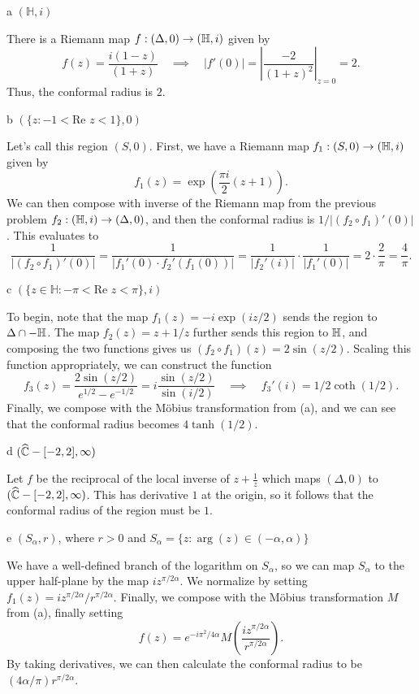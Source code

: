 \documentclass{pset}
\begin{document}
\begin{parts}
  \begin{part}{a}
    $(\mathbb{H}, i)$
  \end{part}

  There is a Riemann map $f : (\Delta, 0) \to (\mathbb{H}, i)$ given by 
  \[
    f(z) = \frac{i(1-z)}{(1+z)}\quad\implies\quad |f'(0)| = \left|\frac{-2}{(1+z)^2}\right|_{z=0} = 2.
  \]
  Thus, the conformal radius is $2$.

  \begin{part}{b}
    $(\{z : -1<\textrm{Re }z<1\}, 0)$
  \end{part}

  Let's call this region $(S, 0)$. First, we have a Riemann map $f_1 : (S, 0) \to (\mathbb{H}, i)$ given by
  \[
    f_1(z) = \exp\left( \frac{\pi i}{2}(z+1)\right).
  \]
  We can then compose with inverse of the Riemann map from the previous problem $f_2 : (\mathbb{H}, i) \to (\Delta, 0)$, and then the conformal radius is $1/|(f_2\circ f_1)'(0)|$. This evaluates to
  \[
    \frac{1}{|(f_2\circ f_1)'(0)|} = \frac{1}{|f_1'(0)\cdot f_2'(f_1(0))|} = \frac{1}{|f_2'(i)|}\cdot \frac{1}{|f_1'(0)|} = 2\cdot \frac{2}{\pi} = \frac{4}{\pi}.
  \]

  \begin{part}{c}
    $(\{z\in \mathbb{H} : -\pi < \textrm{Re }z < \pi\}, i)$
  \end{part}

  To begin, note that the map $f_1(z) = -i\exp(iz/2)$ sends the region to $\Delta \cap -\mathbb{H}$. The map $f_2(z)=z+1/z$ further sends this region to $\mathbb{H}$, and composing the two functions gives us $(f_2\circ f_1)(z)=2\sin(z/2)$. Scaling this function appropriately, we can construct the function
  \[
    f_3(z) = \frac{2\sin(z/2)}{e^{1/2} - e^{-1/2}} = i\frac{\sin(z/2)}{\sin(i/2)}\quad\implies\quad f_3'(i) = 1/2\coth(1/2).
  \]
  Finally, we compose with the M\"obius transformation from (a), and we can see that the conformal radius becomes $4\tanh(1/2)$.

  \begin{part}{d}
    $(\widehat{\mathbb{C}} - [-2, 2], \infty)$
  \end{part}

  Let $f$ be the reciprocal of the local inverse of $z+\frac{1}{z}$ which maps $(\Delta,0)$ to $(\widehat{\mathbb{C}} - [-2, 2], \infty)$. This has derivative $1$ at the origin, so it follows that the conformal radius of the region must be $1$.

  \begin{part}{e}
    $(S_\alpha, r)$, where $r>0$ and $S_\alpha = \{z : \arg(z)\in (-\alpha, \alpha)\}$
  \end{part}

  We have a well-defined branch of the logarithm on $S_\alpha$, so we can map $S_\alpha$ to the upper half-plane by the map $iz^{\pi/2\alpha}$. We normalize by setting $f_1(z) = iz^{\pi /2\alpha}/r^{\pi/2\alpha}$. Finally, we compose with the M\"obius transformation $M$ from (a), finally setting
  \[
    f(z) = e^{-i\pi^2/4\alpha}M\left(\frac{iz^{\pi/2\alpha}}{r^{\pi / 2\alpha}}\right).
  \]
  By taking derivatives, we can then calculate the conformal radius to be $(4\alpha/\pi)r^{\pi/2\alpha}$.
\end{parts}
\end{document}
